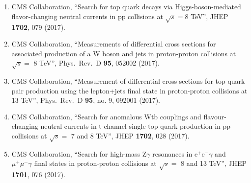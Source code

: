 \begin{itemize}
\begin{enumerate}
\item CMS Collaboration, ``Search for top quark decays via Higgs-boson-mediated flavor-changing neutral currents in pp collisions at $ \sqrt{s}=8 $ TeV'', JHEP {\bf 1702}, 079 (2017).

\item CMS Collaboration, ``Measurements of differential cross sections for associated production of a W boson and jets in proton-proton collisions at $\sqrt{s} =$ 8 TeV'', Phys.\ Rev.\ D {\bf 95}, 052002 (2017).

\item CMS Collaboration, ``Measurement of differential cross sections for top quark pair production using the lepton+jets final state in proton-proton collisions at 13 TeV'', Phys.\ Rev.\ D {\bf 95}, no. 9, 092001 (2017).

\item CMS Collaboration, ``Search for anomalous Wtb couplings and flavour-changing neutral currents in t-channel single top quark production in pp collisions at $\sqrt{s} =$ 7 and 8 TeV'', JHEP {\bf 1702}, 028 (2017).

\item CMS Collaboration, ``Search for high-mass Z$\gamma$ resonances in $\mathrm{ e }^{+}\mathrm{ e }^{-}\gamma $ and $ \mu^{+}\mu^{-}\gamma$ final states in proton-proton collisions at $\sqrt{s} =$ 8 and 13 TeV'', JHEP {\bf 1701}, 076 (2017).


\end{enumerate}
\end{itemize}
